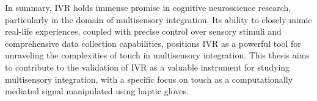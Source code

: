 \documentclass[12pt,oneside,openright]{report}
\begin{document}



In summary, IVR holds immense promise in cognitive neuroscience research, particularly in the domain of multisensory integration. Its ability to closely mimic real-life experiences, coupled with precise control over sensory stimuli and comprehensive data collection capabilities, positions IVR as a powerful tool for unraveling the complexities of touch in multisensory integration. This thesis aims to contribute to the validation of IVR as a valuable instrument for studying multisensory integration, with a specific focus on touch as a computationally mediated signal manipulated using haptic gloves.

\end{document}
